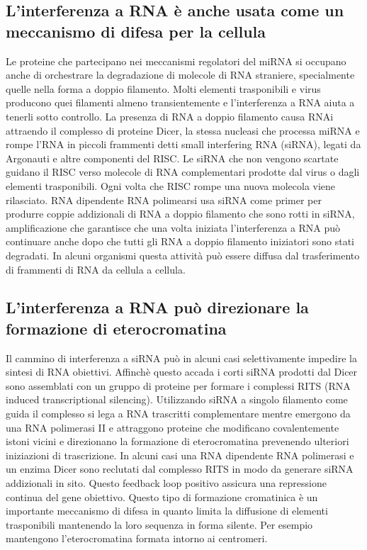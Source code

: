 \subsection{L'interferenza a RNA \`e anche usata come un meccanismo di difesa per la cellula}
Le proteine che partecipano nei meccanismi regolatori del miRNA si occupano anche di orchestrare la degradazione di molecole di RNA straniere, specialmente quelle nella forma a doppio
filamento. Molti elementi trasponibili e virus producono quei filamenti almeno transientemente e l'interferenza a RNA aiuta a tenerli sotto controllo. La presenza di RNA a doppio 
filamento causa RNAi attraendo il complesso di proteine Dicer, la stessa nucleasi che processa miRNA e rompe l'RNA in piccoli frammenti  detti small interfering RNA (siRNA), legati da
Argonauti e altre componenti del RISC. Le siRNA che non vengono scartate guidano il RISC verso molecole di RNA complementari prodotte dal virus o dagli elementi trasponibili. Ogni volta
che RISC rompe una nuova molecola viene rilasciato. RNA dipendente RNA polimearsi usa siRNA come primer per produrre coppie addizionali di RNA a doppio filamento che sono rotti in 
siRNA, amplificazione che garantisce che una volta iniziata l'interferenza a RNA pu\`o continuare anche dopo che tutti gli RNA a doppio filamento iniziatori sono stati degradati. In
alcuni organismi questa attivit\`a pu\`o essere diffusa dal trasferimento di frammenti di RNA da cellula a cellula. 
\subsection{L'interferenza a RNA pu\`o direzionare la formazione di eterocromatina}
Il cammino di interferenza a siRNA pu\`o in alcuni casi selettivamente impedire la sintesi di RNA obiettivi. Affinch\`e questo accada i corti siRNA prodotti dal Dicer sono assemblati 
con un gruppo di proteine per formare i complessi RITS (RNA induced transcriptional silencing). Utilizzando siRNA a singolo filamento come guida il complesso si lega a RNA trascritti
complementare mentre emergono da una RNA polimerasi II e attraggono proteine che modificano covalentemente istoni vicini e direzionano la formazione di eterocromatina prevenendo 
ulteriori iniziazioni di trascrizione. In alcuni casi una RNA dipendente RNA polimerasi e un enzima Dicer sono reclutati dal complesso RITS in modo da generare siRNA addizionali in sito.
Questo feedback loop positivo assicura una repressione continua del gene obiettivo. Questo tipo di formazione cromatinica \`e un importante meccanismo di difesa in quanto limita la
diffusione di elementi trasponibili mantenendo la loro sequenza in forma silente. Per esempio mantengono l'eterocromatina formata intorno ai centromeri. 
